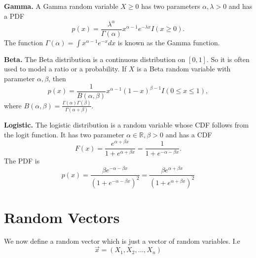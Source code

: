 \documentclass[twoside]{article}
\begin{document}
{\bf Gamma.}
A Gamma random variable $X\geq 0$ has two parameters $\alpha,\lambda>0$
and has a PDF 
$$
p(x) = \frac{\lambda^\alpha}{\Gamma(\alpha)}x^{\alpha-1} e^{-\lambda x}I(x\geq 0).
$$
The function $\Gamma(\alpha) = \int x^{\alpha-1}e^{-x}dx$ is known as the Gamma function.

{\bf Beta.}
The Beta distribution is a continuous distribution on $[0,1]$.
So it is often used to model a ratio or a probability. 
If $X$ is a Beta random variable with parameter $\alpha,\beta$, then 
$$
p(x) = \frac{1}{B(\alpha,\beta)}x^{\alpha-1}(1-x)^{\beta-1}I(0\leq x\leq 1),
$$
where $B(\alpha,\beta) = \frac{\Gamma(\alpha)\Gamma(\beta)}{\Gamma(\alpha+\beta)}.$


{\bf Logistic.}
The logistic distribution is a random variable whose CDF follows from the logit function. 
It has two parameter $\alpha\in\mathbb{R},\beta>0$ and has a CDF
$$
F(x) = \frac{e^{\alpha+\beta x}}{1+e^{\alpha+\beta x}}  = \frac{1}{1+e^{-\alpha-\beta x}}.
$$
The PDF is 
$$
p(x) = \frac{\beta e^{-\alpha-\beta x}}{(1+e^{-\alpha-\beta x})^2} = \frac{\beta e^{\alpha+\beta x}}{(1+e^{\alpha+\beta x})^2}
$$

\section{Random Vectors}
We now define a random vector which is just a vector of random variables. I.e 
$$
\Vec{x}=(X_1,X_2,\dots,X_n)
$$
\end{document}

